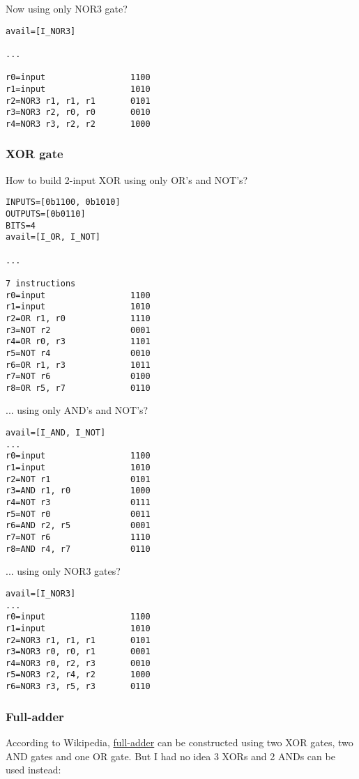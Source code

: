 Now using only NOR3 gate?

\begin{lstlisting}
avail=[I_NOR3]

...

r0=input                 1100
r1=input                 1010
r2=NOR3 r1, r1, r1       0101
r3=NOR3 r2, r0, r0       0010
r4=NOR3 r3, r2, r2       1000
\end{lstlisting}

\subsubsection{XOR gate}

How to build 2-input XOR using only OR's and NOT's?

\begin{lstlisting}
INPUTS=[0b1100, 0b1010]
OUTPUTS=[0b0110]
BITS=4
avail=[I_OR, I_NOT]

...

7 instructions
r0=input                 1100
r1=input                 1010
r2=OR r1, r0             1110
r3=NOT r2                0001
r4=OR r0, r3             1101
r5=NOT r4                0010
r6=OR r1, r3             1011
r7=NOT r6                0100
r8=OR r5, r7             0110
\end{lstlisting}

... using only AND's and NOT's?

\begin{lstlisting}
avail=[I_AND, I_NOT]
...
r0=input                 1100
r1=input                 1010
r2=NOT r1                0101
r3=AND r1, r0            1000
r4=NOT r3                0111
r5=NOT r0                0011
r6=AND r2, r5            0001
r7=NOT r6                1110
r8=AND r4, r7            0110
\end{lstlisting}

... using only NOR3 gates?

\begin{lstlisting}
avail=[I_NOR3]
...
r0=input                 1100
r1=input                 1010
r2=NOR3 r1, r1, r1       0101
r3=NOR3 r0, r0, r1       0001
r4=NOR3 r0, r2, r3       0010
r5=NOR3 r2, r4, r2       1000
r6=NOR3 r3, r5, r3       0110
\end{lstlisting}

\subsubsection{Full-adder}

According to Wikipedia, \href{https://en.wikipedia.org/wiki/Adder_(electronics)}{full-adder}
can be constructed using two XOR gates, two AND gates and one OR gate.
But I had no idea 3 XORs and 2 ANDs can be used instead:

